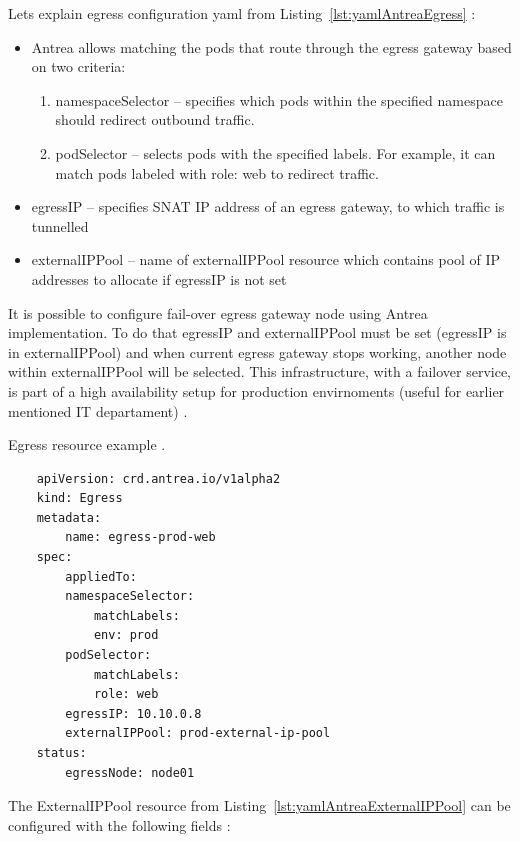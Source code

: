 Lets explain egress configuration yaml from Listing~\ref{lst:yamlAntreaEgress} \cite{AntreaEgressArch}:
\begin{itemize}
    \item Antrea allows matching the pods that route through the egress gateway based on two criteria:

    \begin{enumerate}
        \item namespaceSelector -- specifies which pods within the specified namespace should redirect outbound traffic.
        \item podSelector -- selects pods with the specified labels. For example, it can match pods labeled with role: web to redirect traffic.
    \end{enumerate}

    \item egressIP -- specifies SNAT IP address of an egress gateway, to which traffic is tunnelled
    \item externalIPPool -- name of externalIPPool resource which contains pool of IP addresses to allocate if egressIP is not set
\end{itemize}

It is possible to configure fail-over egress gateway node using Antrea implementation. To do that egressIP and externalIPPool must be set (egressIP is in externalIPPool) and when current egress gateway stops working, another node within externalIPPool will be selected. This infrastructure, with a failover service, is part of a high availability setup for production envirnoments (useful for earlier mentioned IT departament) \cite{AntreaEgressArch}.


\begin{listing}[htb]
    \centering
    \caption{Egress resource example \cite{AntreaEgressArch}.}
    \begin{verbatim}
    apiVersion: crd.antrea.io/v1alpha2
    kind: Egress
    metadata:
        name: egress-prod-web
    spec:
        appliedTo:
        namespaceSelector:
            matchLabels:
            env: prod
        podSelector:
            matchLabels:
            role: web
        egressIP: 10.10.0.8
        externalIPPool: prod-external-ip-pool
    status:
        egressNode: node01
    \end{verbatim}
    \label{lst:yamlAntreaEgress}
\end{listing}

The ExternalIPPool resource from Listing~\ref{lst:yamlAntreaExternalIPPool} can be configured with the following fields \cite{AntreaEgressArch}:


